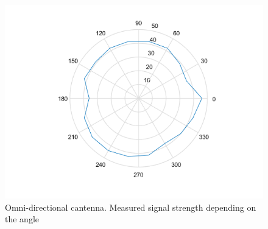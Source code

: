 \begin{figure}
	\includegraphics[width=\textwidth]{plots/polar_omni_p.png}
	\caption{Omni-directional cantenna. Measured signal strength depending on the angle}
	\label{img:ang:pow:omni}
\end{figure}

